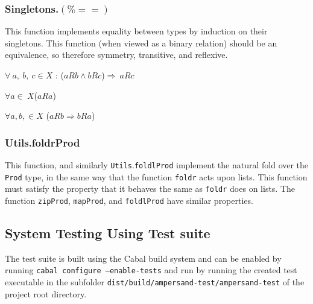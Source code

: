 \subsubsection*{Singletons.$\boldsymbol{(\%==)}$} 
This function implements equality between types by induction on their singletons.
This function (when viewed as a binary relation) should be an equivalence, 
so therefore symmetry, transitive, and reflexive. 

\begin{description}[labelindent=1cm]
\item[Transitivity] $\forall\ a,\ b,\ c \in  X$ : ($aRb \wedge bRc$)$ \Rightarrow\ aRc$
\item[Reflexivity] $\forall a \in\ X $($aRa$)  
\item[Symmetry] $\forall a, b, \in X$ ($aRb \Rightarrow bRa$) 
\end{description}

\subsubsection*{Utils.foldrProd}
This function, and similarly \lstinline{Utils}.\lstinline{foldlProd} implement
the natural fold over the \lstinline{Prod} type, in the same way that 
the function \lstinline{foldr} acts upon lists. This function
must satisfy the property that it behaves the same as \lstinline{foldr}
does on lists. The function \lstinline{zipProd}, \lstinline{mapProd}, and \lstinline{foldlProd}
have similar properties. 


\subsection{System Testing Using Test suite}
The test suite is built using the Cabal build system and can be 
enabled by running \texttt{cabal configure --enable-tests} and
run by running the created test executable in the subfolder
\texttt{dist/build/ampersand-test/ampersand-test} of the 
project root directory. 


